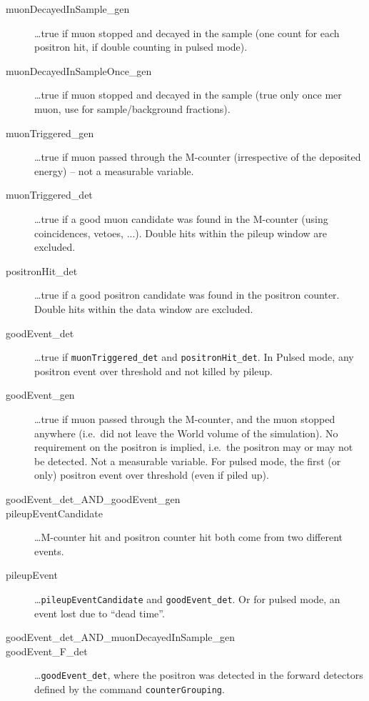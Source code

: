 \documentclass[twoside]{dis04}
\begin{document}
\begin{description}
\begin{description}
	\item[muonDecayedInSample\_gen] \ldots  true if muon stopped and decayed in the sample (one count for each positron hit, if double counting in pulsed mode).
	\item[muonDecayedInSampleOnce\_gen] \ldots  true if muon stopped and decayed in the sample (true only once mer muon, use for sample/background fractions).
	\item[muonTriggered\_gen]       \ldots  true if muon passed through the M-counter (irrespective of the deposited energy) 
	                                       -- not a measurable variable.
	\item[muonTriggered\_det]       \ldots  true if a good muon candidate was found in the M-counter (using coincidences, vetoes, ...).
	                                       Double hits within the pileup window are excluded.
	\item[positronHit\_det]         \ldots  true if a good positron candidate was found in the positron counter.  
	                                       Double hits within the data window are excluded.
	\item[goodEvent\_det]           \ldots  true if {\tt muonTriggered\_det} and {\tt positronHit\_det}. In Pulsed mode, any positron event over threshold and not killed by pileup.
	\item[goodEvent\_gen]           \ldots  true if muon passed through the M-counter, and the muon stopped anywhere 
	                                       (i.e.\ did not leave the World volume of the simulation).  No requirement
	                                       on the positron is implied, i.e.\ the positron may or may not be detected.
					       Not a measurable variable. For pulsed mode, the first (or only) positron event over threshold (even if piled up).
	\item[goodEvent\_det\_AND\_goodEvent\_gen] 
	\item[pileupEventCandidate]    \ldots  M-counter hit and positron counter hit both come from two different events.
	\item[pileupEvent]             \ldots  {\tt pileupEventCandidate} and {\tt goodEvent\_det}. Or for pulsed mode, an event lost due to ``dead time''.
	\item[goodEvent\_det\_AND\_muonDecayedInSample\_gen] 
	\item[goodEvent\_F\_det]         \ldots  {\tt goodEvent\_det}, where the positron was detected in the forward detectors
	                                       defined by the command {\tt counterGrouping}.

\end{description}
\end{description}
\end{document}
